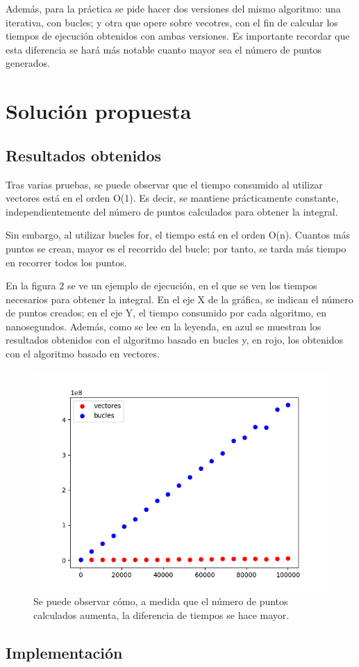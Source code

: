 \documentclass[11pt]{article}
\begin{document}
 Además, para la práctica se pide hacer dos versiones del mismo algoritmo: una iterativa, con bucles; y otra que opere sobre vecotres, con el fin de calcular los tiempos de ejecución obtenidos con ambas versiones. Es importante recordar que esta diferencia se hará más notable cuanto mayor sea el número de puntos generados.
\newpage
\section{Solución propuesta}

\subsection{Resultados obtenidos}

 Tras varias pruebas, se puede observar que el tiempo consumido al utilizar vectores está en el orden O(1). Es decir, se mantiene prácticamente constante, independientemente del número de puntos calculados para obtener la integral.

 Sin embargo, al utilizar bucles for, el tiempo está en el orden O(n). Cuantos más puntos se crean, mayor es el recorrido del bucle; por tanto, se tarda más tiempo en recorrer todos los puntos.

 En la figura 2 se ve un ejemplo de ejecución, en el que se ven los tiempos necesarios para obtener la integral. En el eje X de la gráfica, se indican el número de puntos creados; en el eje Y, el tiempo consumido por cada algoritmo, en nanosegundos. Además, como se lee en la leyenda, en azul se muestran los resultados obtenidos con el algoritmo basado en bucles y, en rojo, los obtenidos con el algoritmo basado en vectores.
 
 \begin{figure}[h!]
    \begin{center}
    \includegraphics[width=\textwidth]{Resultados.png}
    \caption{Se puede observar cómo, a medida que el número de puntos calculados aumenta, la diferencia de tiempos se hace mayor.}
    \label{fig:Resultados}
    \end{center}
 \end{figure}
\subsection{Implementación}


\end{document}
